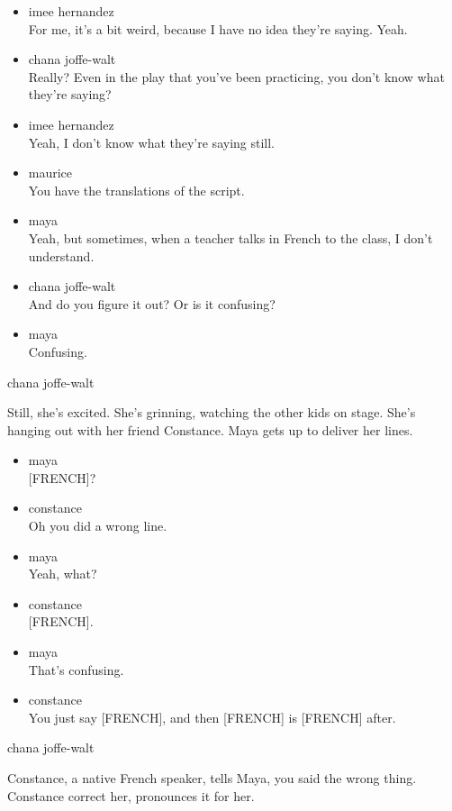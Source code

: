 \begin{itemize}
\item
  imee hernandez\\
  For me, it's a bit weird, because I have no idea they're saying. Yeah.
\item
  chana joffe-walt\\
  Really? Even in the play that you've been practicing, you don't know
  what they're saying?
\item
  imee hernandez\\
  Yeah, I don't know what they're saying still.
\item
  maurice\\
  You have the translations of the script.
\item
  maya\\
  Yeah, but sometimes, when a teacher talks in French to the class, I
  don't understand.
\item
  chana joffe-walt\\
  And do you figure it out? Or is it confusing?
\item
  maya\\
  Confusing.
\end{itemize}

chana joffe-walt

Still, she's excited. She's grinning, watching the other kids on stage.
She's hanging out with her friend Constance. Maya gets up to deliver her
lines.

\begin{itemize}
\item
  maya\\
  {[}FRENCH{]}?
\item
  constance\\
  Oh you did a wrong line.
\item
  maya\\
  Yeah, what?
\item
  constance\\
  {[}FRENCH{]}.
\item
  maya\\
  That's confusing.
\item
  constance\\
  You just say {[}FRENCH{]}, and then {[}FRENCH{]} is {[}FRENCH{]}
  after.
\end{itemize}

chana joffe-walt

Constance, a native French speaker, tells Maya, you said the wrong
thing. Constance correct her, pronounces it for her.

